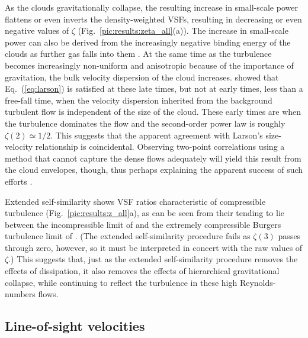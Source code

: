 As the clouds gravitationally collapse, the resulting increase in small-scale power flattens or even inverts the density-weighted VSFs, resulting in decreasing or even negative values of $\zeta$ (Fig.~\ref{pic:results:zeta_all}(a)). The increase in small-scale power can also be derived from the increasingly negative binding energy of the clouds as further gas falls into them . 
At the same time as the turbulence becomes increasingly non-uniform and anisotropic because of the importance of gravitation, the bulk velocity dispersion of the cloud increases.
 showed that Eq.~(\ref{eq:larson}) is satisfied at these late times, but not at early times, less than a free-fall time, when the velocity dispersion inherited from the background turbulent flow is independent of the size of the cloud. 
These early times are when the turbulence dominates the flow and the second-order power law is roughly $\zeta(2) \simeq 1/2$.
This suggests that the apparent agreement with Larson's size-velocity relationship is coincidental. Observing two-point correlations using a method that cannot capture the dense flows adequately will yield this result from the cloud envelopes, though, thus perhaps explaining the apparent success of such efforts \citep[][Fig.\ 9 shows how these different interpretations can arise]{Goodman1998}.

Extended self-similarity shows VSF ratios characteristic of compressible turbulence (Fig.~\ref{pic:results:z_all}a), as can be seen from their tending to lie between the incompressible limit of \citet{She1994} and the extremely compressible Burgers turbulence limit of \citet{Boldyrev2002}.
(The extended self-similarity procedure fails as $\zeta(3)$ passes through zero, however, so it must be interpreted in concert with the raw values of $\zeta$.)
This suggests that, just as the extended self-similarity procedure removes the effects of dissipation, it also removes the effects of hierarchical gravitational collapse, while continuing to reflect the turbulence in these high Reynolds-numbers flows.


\subsection{Line-of-sight velocities}\label{discussion:1d}

